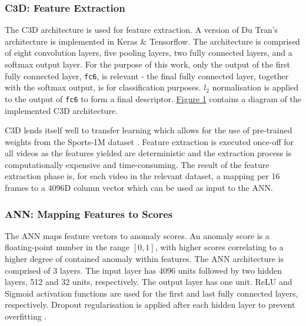 \documentclass[sigplan,authorversion,nonacm, 9pt]{acmart}
\begin{document}
\subsubsection{C3D: Feature Extraction}
The C3D architecture is used for feature extraction. A version of Du Tran's \cite{dutran} architecture is implemented in Keras \& Tensorflow. The architecture is comprised of eight convolution layers, five pooling layers, two fully connected layers, and a softmax output layer. For the purpose of this work, only the output of the first fully connected layer, \texttt{fc6}, is relevant - the final fully connected layer, together with the softmax output, is for classification purposes. $l_2$ normalisation is applied to the output of \texttt{fc6} to form a final descriptor. \hyperref[fig:basemodel]{Figure 1} contains a diagram of the implemented C3D architecture. 
\par
C3D lends itself well to transfer learning which allows for the use of pre-trained weights from the Sports-1M dataset \cite{sports1m}. 
Feature extraction is executed once-off for all videos as the features yielded are deterministic and the extraction process is computationally expensive and time-consuming.
The result of the feature extraction phase is, for each video in the relevant dataset, a mapping per 16 frames to a 4096D column vector which can be used as input to the ANN. 
\par
\subsubsection{ANN: Mapping Features to Scores}
The ANN maps feature vectors to anomaly scores. An anomaly score is a floating-point number in the range $[0,1]$, with higher scores correlating to a higher degree of contained anomaly within features. The ANN architecture is comprised of 3 layers. The input layer has 4096 units followed by two hidden layers, 512 and 32 units, respectively. The output layer has one unit. ReLU and Sigmoid activation functions are used for the first and last fully connected layers, respectively.  Dropout regularisation is applied after each hidden layer to prevent overfitting \cite{dropout}. 
\end{document}
